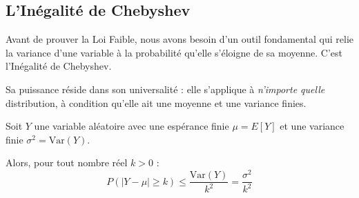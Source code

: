 \subsection{L'Inégalité de Chebyshev}

Avant de prouver la Loi Faible, nous avons besoin d'un outil fondamental qui relie la variance d'une variable à la probabilité qu'elle s'éloigne de sa moyenne. C'est l'Inégalité de Chebyshev.

Sa puissance réside dans son universalité : elle s'applique à \textit{n'importe quelle} distribution, à condition qu'elle ait une moyenne et une variance finies.

\begin{theorembox}
Soit $Y$ une variable aléatoire avec une espérance finie $\mu = E[Y]$ et une variance finie $\sigma^2 = \text{Var}(Y)$.

Alors, pour tout nombre réel $k > 0$ :
$$ P(|Y - \mu| \ge k) \le \frac{\text{Var}(Y)}{k^2} = \frac{\sigma^2}{k^2} $$
\end{theorembox}

